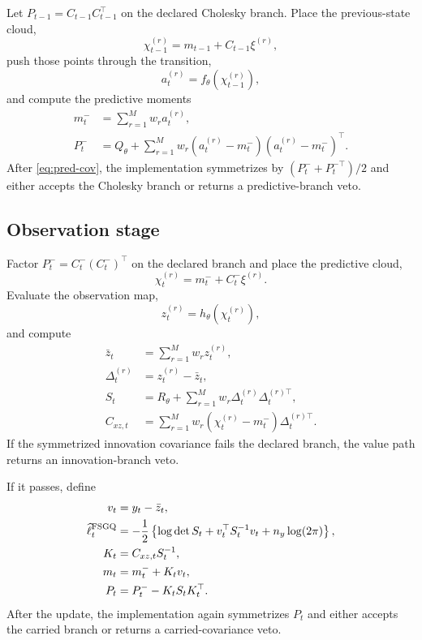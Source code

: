 \documentclass[11pt]{article}
\numberwithin{equation}{section}
\newcommand{\ellhat}{\widehat\ell}
\begin{document}
Let \(P_{t-1}=C_{t-1}C_{t-1}^\top\) on the declared Cholesky branch.  Place the
previous-state cloud,
\begin{equation}
  \chi_{t-1}^{(r)} = m_{t-1}+C_{t-1}\xi^{(r)},
  \label{eq:pred-placed-points}
\end{equation}
push those points through the transition,
\begin{equation}
  a_t^{(r)} = f_\theta(\chi_{t-1}^{(r)}),
  \label{eq:transition-points}
\end{equation}
and compute the predictive moments
\begin{align}
  m_t^- &= \sum_{r=1}^M w_r a_t^{(r)},
  \label{eq:pred-mean}\\
  P_t^- &= Q_\theta + \sum_{r=1}^M w_r
  (a_t^{(r)}-m_t^-)(a_t^{(r)}-m_t^-)^\top.
  \label{eq:pred-cov}
\end{align}
After \eqref{eq:pred-cov}, the implementation symmetrizes by
\((P_t^-+P_t^{-\top})/2\) and either accepts the Cholesky branch or returns a
predictive-branch veto.

\subsection{Observation stage}

Factor \(P_t^-=C_t^-(C_t^-)^\top\) on the declared branch and place the
predictive cloud,
\begin{equation}
  \chi_t^{(r)} = m_t^- + C_t^-\xi^{(r)}.
  \label{eq:obs-placed-points}
\end{equation}
Evaluate the observation map,
\begin{equation}
  z_t^{(r)} = h_\theta(\chi_t^{(r)}),
  \label{eq:obs-values}
\end{equation}
and compute
\begin{align}
  \bar z_t &= \sum_{r=1}^M w_r z_t^{(r)},
  \label{eq:obs-mean}\\
  \Delta_t^{(r)} &= z_t^{(r)}-\bar z_t,
  \label{eq:obs-centered}\\
  S_t &= R_\theta + \sum_{r=1}^M w_r \Delta_t^{(r)}\Delta_t^{(r)\top},
  \label{eq:obs-cov}\\
  C_{xz,t} &= \sum_{r=1}^M w_r
  (\chi_t^{(r)}-m_t^-)\Delta_t^{(r)\top}.
  \label{eq:cross-cov}
\end{align}
If the symmetrized innovation covariance fails the declared branch, the value
path returns an innovation-branch veto.

If it passes, define
\begin{align}
  v_t &= y_t-\bar z_t,
  \label{eq:innovation}\\
  \ellhat_t^{\rm FSGQ}
  &=
  -\frac12\left\{\log\det S_t + v_t^\top S_t^{-1}v_t + n_y\log(2\pi)\right\},
  \label{eq:value-loglik}\\
  K_t &= C_{xz,t}S_t^{-1},
  \label{eq:kalman-gain}\\
  m_t &= m_t^- + K_t v_t,
  \label{eq:filter-mean}\\
  P_t &= P_t^- - K_tS_tK_t^\top.
  \label{eq:filter-cov}
\end{align}
After the update, the implementation again symmetrizes \(P_t\) and either
accepts the carried branch or returns a carried-covariance veto.
\end{document}
